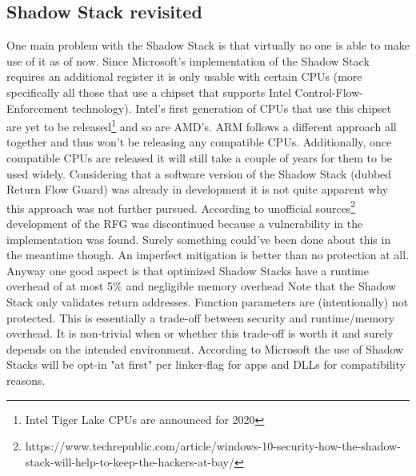 \documentclass[10pt,twocolumn,a4paper]{article}
\begin{document}
\subsection{Shadow Stack revisited}
One main problem with the Shadow Stack is that virtually no one is able to make use of it as of now. Since Microsoft's implementation of the Shadow Stack requires an additional register it is only usable with certain CPUs (more specifically all those that use a chipset that supports Intel Control-Flow-Enforcement technology).
Intel's first generation of CPUs that use this chipset are yet to be released\footnote{Intel Tiger Lake CPUs are announced for 2020} and so are AMD's.
ARM follows a different approach all together and thus won't be releasing any compatible CPUs.
Additionally, once compatible CPUs are released it will still take a couple of years for them to be used widely.
Considering that a software version of the Shadow Stack (dubbed Return Flow Guard) was already in development it is not quite apparent why this approach was not further pursued.
According to unofficial sources\footnote{https://www.techrepublic.com/article/windows-10-security-how-the-shadow-stack-will-help-to-keep-the-hackers-at-bay/} development of the RFG was discontinued because a vulnerability in the implementation was found. Surely something could've been done about this in the meantime though. An imperfect mitigation is better than no protection at all.
Anyway one good aspect is that optimized Shadow Stacks have a runtime overhead of at most 5\% and negligible memory overhead
Note that the Shadow Stack only validates return addresses. Function parameters are (intentionally) not protected. This is essentially a trade-off between security and runtime/memory overhead. It is non-trivial when or whether this trade-off is worth it and surely depends on the intended environment.
According to Microsoft the use of Shadow Stacks will be opt-in "at first" per linker-flag for apps and DLLs for compatibility reasons.
\end{document}
